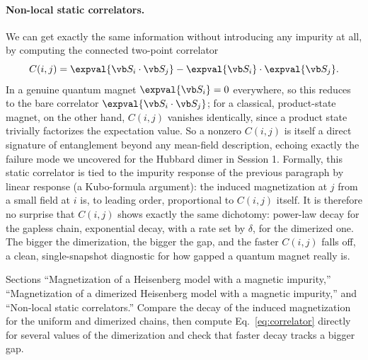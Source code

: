 \documentclass[all_sessions.tex]{subfiles}
\begin{document}
\paragraph{Non-local static correlators.} We can get exactly the same information without introducing
any impurity at all, by computing the connected two-point correlator
\begin{equation}
  C(i,j) = \expval{\vb S_i\cdot\vb S_j} - \expval{\vb S_i}\cdot\expval{\vb S_j}.
  \label{eq:correlator}
\end{equation}
In a genuine quantum magnet $\expval{\vb S_i}=0$ everywhere, so this reduces to the bare correlator
$\expval{\vb S_i\cdot\vb S_j}$; for a classical, product-state magnet, on the other hand, $C(i,j)$
vanishes identically, since a product state trivially factorizes the expectation value. So a nonzero
$C(i,j)$ is itself a direct signature of entanglement beyond any mean-field description, echoing exactly
the failure mode we uncovered for the Hubbard dimer in Session 1. Formally, this static correlator is
tied to the impurity response of the previous paragraph by linear response (a Kubo-formula argument):
the induced magnetization at $j$ from a small field at $i$ is, to leading order, proportional to
$C(i,j)$ itself. It is therefore no surprise that $C(i,j)$ shows exactly the same dichotomy: power-law
decay for the gapless chain, exponential decay, with a rate set by $\delta$, for the dimerized one. The
bigger the dimerization, the bigger the gap, and the faster $C(i,j)$ falls off, a clean, single-snapshot
diagnostic for how gapped a quantum magnet really is.

\begin{notebook}
Sections ``Magnetization of a Heisenberg model with a magnetic impurity,'' ``Magnetization of a
dimerized Heisenberg model with a magnetic impurity,'' and ``Non-local static correlators.'' Compare
the decay of the induced magnetization for the uniform and dimerized chains, then compute
Eq.~\eqref{eq:correlator} directly for several values of the dimerization and check that faster decay
tracks a bigger gap.
\end{notebook}
\end{document}
